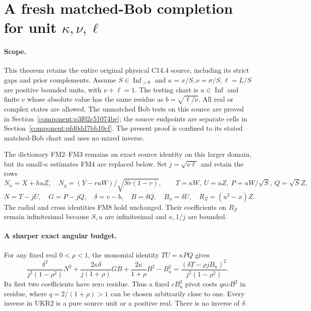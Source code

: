 \section{\texorpdfstring{A fresh matched-Bob completion for unit $\kappa,\nu,\ell$}{A fresh matched-Bob completion for unit kappa,nu,ell}}
\label{component:pd26b89cdb3f0}

\label{pd26b89cdb3f0:sec:new-c144-unit-kappa-matched}

\paragraph{Scope.}
This theorem retains the entire original physical C14.4 source,
including its strict gaps and prior complements. Assume
$S\in\operatorname{Inf}_{>0}$ and $\kappa=x/S,\nu=\sigma/S,
\ell=L/S$ are positive bounded units, with $\nu+\ell=1$.
The testing chart is $u\in\operatorname{Inf}$ and finite $v$
whose absolute value has the same residue as
$b=\sqrt{\ell/\nu}$. All real or complex states are allowed.
The unmatched Bob tests on this source are proved in Section~\ref{component:p3f02c51074be}; the source endpoints are separate cells in Section~\ref{component:pfd0dd7bb10cf}. The present proof is confined to its stated matched-Bob chart and uses no mixed inverse.

The dictionary FM2--FM3 remains an exact source identity on this
larger domain, but its small-$\kappa$ estimates FM4 are replaced
below. Set $j=\sqrt{\nu\ell}$ and retain the rows
\[
 N_x=X+huZ,\quad N_y=(Y-ruW)/\sqrt{Sr(1-r)},\qquad
 T=\kappa W,\ U=uZ,\ P=uW/\sqrt S,\ Q=\sqrt S Z,
\]
\[
 N=T-jU,\quad G=P-jQ,\quad \delta=v-b,\quad
 B=\delta Q,\quad B_u=\delta U,\quad R_Z=(u^2-x)Z.
 \tag{UKR1}
\]
The radial and cross identities FM8 hold unchanged. Their
coefficients on $R_Z$ remain infinitesimal because $S,u$ are
infinitesimal and $\kappa,1/j$ are bounded.

\paragraph{A sharper exact angular budget.}
For any fixed real $0<\rho<1$, the monomial identity $TU=\kappa PQ$
gives
\[
 \frac{\delta^2}{j^2(1-\rho^2)}N^2+
 \frac{2\kappa\delta}{j(1+\rho)}GB+
 \frac{2\kappa}{1+\rho}B^2-B_u^2
   =\frac{(\delta T-\rho jB_u)^2}{j^2(1-\rho^2)}.
 \tag{UKR2}
\]
Its first two coefficients have zero residue. Thus a fixed
$cB_u^2$ pivot costs $q\kappa cB^2$ in residue, where
$q=2/(1+\rho)>1$ can be chosen arbitrarily close to one.
Every inverse in UKR2 is a pure source unit or a positive real.
There is no inverse of $\delta$.

